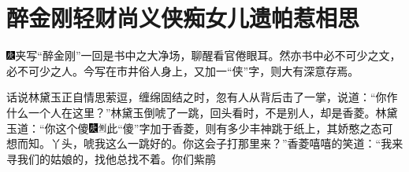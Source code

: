 

\chapter{醉金刚轻财尚义侠\hspace{.5em}痴女儿遗帕惹相思}
{}

{\includegraphics[width=3mm]{../Images/00004}夹写``醉金刚''一回是书中之大净场，聊醒看官倦眼耳。然亦书中必不可少之文，必不可少之人。今写在市井俗人身上，又加一``侠''字，则大有深意存焉。}

话说林黛玉正自情思萦逗，缠绵固结之时，忽有人从背后击了一掌，说道：``你作什么一个人在这里？''林黛玉倒唬了一跳，回头看时，不是别人，却是香菱。林黛玉道：``你这个傻{\includegraphics[width=3mm]{../Images/00004}\includegraphics[width=3mm]{../Images/00011}\footnotesize \kaishu 此``傻''字加于香菱，则有多少丰神跳于纸上，其娇憨之态可想而知。}丫头，唬我这么一跳好的。你这会子打那里来？''香菱嘻嘻的笑道：``我来寻我们的姑娘的，找他总找不着。你们紫鹃